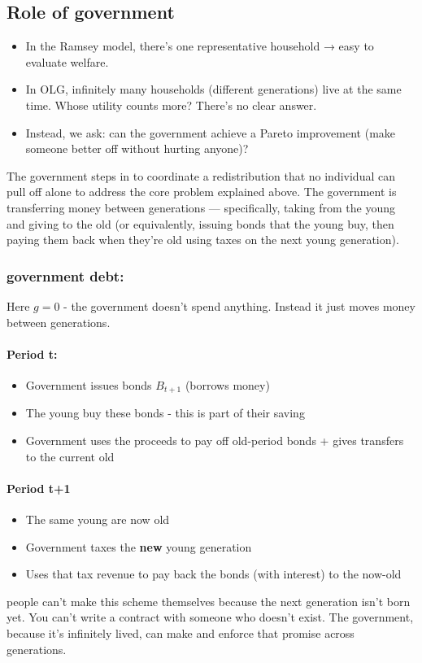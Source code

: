 \documentclass[12pt]{article}
\begin{document}
\subsection{Role of government}
\begin{itemize}
    \item In the Ramsey model, there's one representative household → easy to evaluate welfare.
    \item In OLG, infinitely many households (different generations) live at the same time. Whose utility counts more? There's no clear answer.
    \item Instead, we ask: can the government achieve a Pareto improvement (make someone better off without hurting anyone)?
\end{itemize}
The government steps in to coordinate a redistribution that no individual can pull off alone to address the core problem explained above. The government is transferring money between generations — specifically, taking from the young and giving to the old (or equivalently, issuing bonds that the young buy, then paying them back when they're old using taxes on the next young generation).
\subsubsection{government debt:}
Here $g=0$ - the government doesn't spend anything. Instead it just moves money between generations.
\paragraph{Period t:}
\begin{itemize}
    \item Government issues bonds $B_{t+1}$ (borrows money)
    \item The young buy these bonds - this is part of their saving
    \item Government uses the proceeds to pay off old-period bonds + gives transfers to the current old
\end{itemize}

\paragraph{Period t+1}
\begin{itemize}
    \item The same young are now old
    \item Government taxes the \textbf{new} young generation
    \item Uses that tax revenue to pay back the bonds (with interest) to the now-old
\end{itemize}
people can't make this scheme themselves because the next generation isn't born yet. You can't write a contract with someone who doesn't exist. The government, because it's infinitely lived, can make and enforce that promise across generations.
\end{document}
